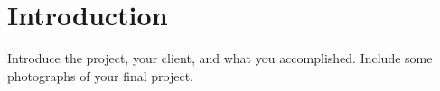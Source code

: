 \section{Introduction}

Introduce the project, your client, and what you accomplished. Include some photographs of your final project. 
